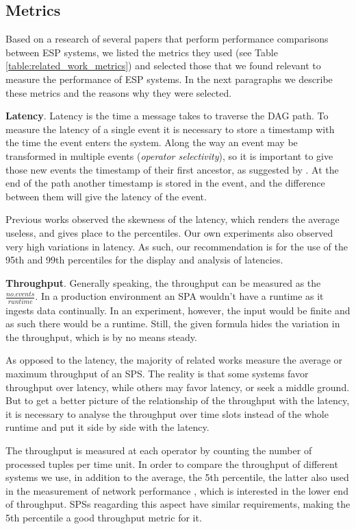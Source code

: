 \documentclass[ppgc,diss,english]{iiufrgs}
\begin{document}
\subsection{Metrics}

Based on a research of several papers that perform performance comparisons between ESP systems, we listed the metrics they used (see Table \ref{table:related_work_metrics}) and selected those that we found relevant to measure the performance of ESP systems. In the next paragraphs we describe these metrics and the reasons why they were selected.

\textbf{Latency}. Latency is the time a message takes to traverse the DAG path. To measure the latency of a single event it is necessary to store a timestamp with the time the event enters the system. Along the way an event may be transformed in multiple events (\emph{operator selectivity}), so it is important to give those new events the timestamp of their first ancestor, as suggested by \cite{chandramouli2011accurate}. At the end of the path another timestamp is stored in the event, and the difference between them will give the latency of the event.

Previous works \cite{dayarathna2011performance, akidau2013millwheel, castro2013integrating} observed the skewness of the latency, which renders the average useless, and gives place to the percentiles. Our own experiments also observed very high variations in latency. As such, our recommendation is for the use of the 95th and 99th percentiles for the display and analysis of latencies.

\textbf{Throughput}. Generally speaking, the throughput can be measured as the $\frac{no. events}{runtime}$. In a production environment an SPA wouldn't have a runtime as it ingests data continually. In an experiment, however, the input would be finite and as such there would be a runtime. Still, the given formula hides the variation in the throughput, which is by no means steady.

As opposed to the latency, the majority of related works measure the average or maximum throughput of an SPS. The reality is that some systems favor throughput over latency, while others may favor latency, or seek a middle ground. But to get a better picture of the relationship of the throughput with the latency, it is necessary to analyse the throughput over time slots instead of the whole runtime and put it side by side with the latency.

The throughput is measured at each operator by counting the number of processed tuples per time unit. In order to compare the throughput of different systems we use, in addition to the average, the 5th percentile, the latter also used in the measurement of network performance \cite{litjens2010potential, landstrom2011deployment}, which is interested in the lower end of throughput. SPSs reagarding this aspect have similar requirements, making the 5th percentile a good throughput metric for it.
\end{document}
